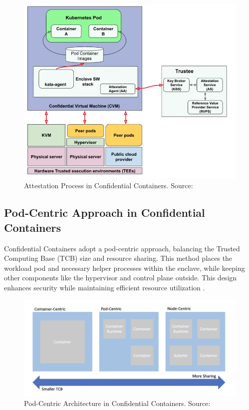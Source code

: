 \documentclass[conference]{IEEEtran}
\begin{document}
\begin{figure}[H]
\centerline{\includegraphics[width=\linewidth]{figures/attestation_process.png}}
\caption{Attestation Process in Confidential Containers. Source: \cite{redhat_attestation}}
\label{fig:attestation}
\end{figure}

\subsection{Pod-Centric Approach in Confidential Containers}
Confidential Containers adopt a pod-centric approach, balancing the Trusted Computing Base (TCB) 
size and resource sharing. This method places the workload pod and necessary helper processes 
within the enclave, while keeping other components like the hypervisor and control plane outside. 
This design enhances security while maintaining efficient resource utilization \cite{coco_architecture}.

\begin{figure}[H]
\centerline{\includegraphics[width=\linewidth]{figures/pod_centric_architecture.png}}
\caption{Pod-Centric Architecture in Confidential Containers. Source: \cite{coco_architecture}}
\label{fig:pod_centric}
\end{figure}
\end{document}
